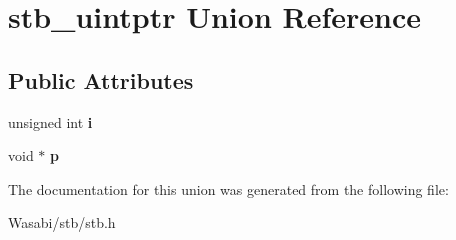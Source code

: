 \hypertarget{unionstb__uintptr}{}\section{stb\+\_\+uintptr Union Reference}
\label{unionstb__uintptr}
\subsection*{Public Attributes}
\begin{DoxyCompactItemize}
\item 
unsigned int {\bfseries i}\hypertarget{unionstb__uintptr_a160136653749a4a642c5db8116604f22}{}\label{unionstb__uintptr_a160136653749a4a642c5db8116604f22}

\item 
void $\ast$ {\bfseries p}\hypertarget{unionstb__uintptr_aee3334a3b5b120d1179c07e911508f4f}{}\label{unionstb__uintptr_aee3334a3b5b120d1179c07e911508f4f}

\end{DoxyCompactItemize}


The documentation for this union was generated from the following file\+:\begin{DoxyCompactItemize}
\item 
Wasabi/stb/stb.\+h\end{DoxyCompactItemize}
